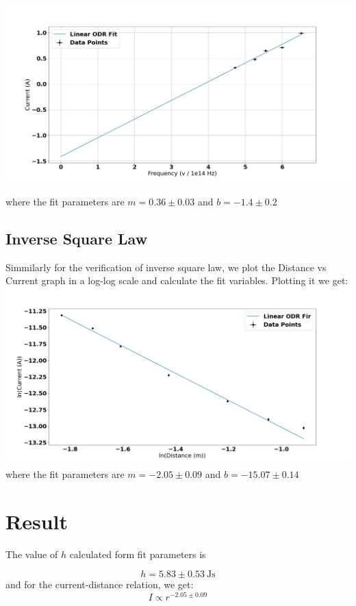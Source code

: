 \documentclass[%
 sor,
 jor,
 amsmath,amssymb,
 reprint,%
]{revtex4-2}
\begin{document}
\includegraphics[scale=0.31]{Figure_2}

where the fit parameters are $ m  =  0.36 \pm 0.03 $ and $  b =   -1.4 \pm 0.2 $ 





\subsection{Inverse Square Law}
Simmilarly for the verification of inverse square law, we plot the Distance vs Current graph in a log-log scale and calculate the fit variables. Plotting it we get:\\
\includegraphics[scale=0.31]{Figure_1}
where the fit parameters are $ m  = -2.05 \pm 0.09$ and $  b =  -15.07\pm 0.14$ 


\section{Result}
The value of $h$ calculated form fit parameters is

$$
h = 5.83 \pm 0.53 ~\si{\joule\second}
$$
and for the current-distance relation, we get:
$$
I \propto r^{ -2.05\pm0.09}
$$
\end{document}
